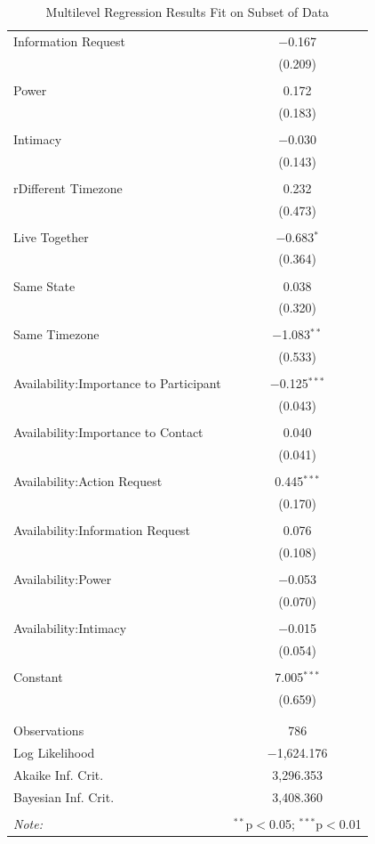 \documentclass[12pt]{nuthesis}	%
\begin{document}
\begin{appendix}
\begin{table}
\begin{tabular}{@{\extracolsep{5pt}}lc}
 Information Request & $-$0.167 \\ 
  & (0.209) \\ 
  & \\ 
 Power & 0.172 \\ 
  & (0.183) \\ 
  & \\ 
 Intimacy & $-$0.030 \\ 
  & (0.143) \\ 
  & \\ 
 rDifferent Timezone & 0.232 \\ 
  & (0.473) \\ 
  & \\ 
Live Together & $-$0.683$^{*}$ \\ 
  & (0.364) \\ 
  & \\ 
Same State & 0.038 \\ 
  & (0.320) \\ 
  & \\ 
Same Timezone & $-$1.083$^{**}$ \\ 
  & (0.533) \\ 
  & \\ 
 Availability:Importance to Participant & $-$0.125$^{***}$ \\ 
  & (0.043) \\ 
  & \\ 
 Availability:Importance to Contact & 0.040 \\ 
  & (0.041) \\ 
  & \\ 
 Availability:Action Request & 0.445$^{***}$ \\ 
  & (0.170) \\ 
  & \\ 
 Availability:Information Request & 0.076 \\ 
  & (0.108) \\ 
  & \\ 
 Availability:Power & $-$0.053 \\ 
  & (0.070) \\ 
  & \\ 
 Availability:Intimacy & $-$0.015 \\ 
  & (0.054) \\ 
  & \\ 
 Constant & 7.005$^{***}$ \\ 
  & (0.659) \\ 
  & \\ 
\hline \\[-1.8ex] 
Observations & 786 \\ 
Log Likelihood & $-$1,624.176 \\ 
Akaike Inf. Crit. & 3,296.353 \\ 
Bayesian Inf. Crit. & 3,408.360 \\ 
\hline 
\hline \\[-1.8ex] 
\textit{Note:}  & \multicolumn{1}{r}{$^{**}$p$<$0.05; $^{***}$p$<$0.01} \\ 
\end{tabular} 
  \caption{Multilevel Regression Results Fit on Subset of Data} 
  \label{tab:robust_regression} 
\end{table} 


\end{appendix}
\end{document}
